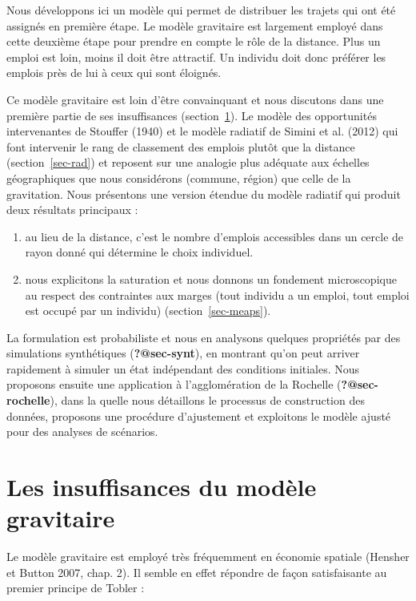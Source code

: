 \documentclass[
  10pt,
  a4paper,
  numbers=noendperiod,
  DIV=9]{scrreprt}
\begin{document}
Nous développons ici un modèle qui permet de distribuer les trajets qui
ont été assignés en première étape. Le modèle gravitaire est largement
employé dans cette deuxième étape pour prendre en compte le rôle de la
distance. Plus un emploi est loin, moins il doit être attractif. Un
individu doit donc préférer les emplois près de lui à ceux qui sont
éloignés.

Ce modèle gravitaire est loin d'être convainquant et nous discutons dans
une première partie de ses insuffisances (section~\ref{sec-grav}). Le
modèle des opportunités intervenantes de Stouffer (1940) et le modèle
radiatif de Simini et al. (2012) qui font intervenir le rang de
classement des emplois plutôt que la distance (section~\ref{sec-rad}) et
reposent sur une analogie plus adéquate aux échelles géographiques que
nous considérons (commune, région) que celle de la gravitation. Nous
présentons une version étendue du modèle radiatif qui produit deux
résultats principaux :

\begin{enumerate}
\def\labelenumi{\arabic{enumi}.}
\item
  au lieu de la distance, c'est le nombre d'emplois accessibles dans un
  cercle de rayon donné qui détermine le choix individuel.
\item
  nous explicitons la saturation et nous donnons un fondement
  microscopique au respect des contraintes aux marges (tout individu a
  un emploi, tout emploi est occupé par un individu)
  (section~\ref{sec-meaps}).
\end{enumerate}

La formulation est probabiliste et nous en analysons quelques propriétés
par des simulations synthétiques (\textbf{?@sec-synt}), en montrant
qu'on peut arriver rapidement à simuler un état indépendant des
conditions initiales. Nous proposons ensuite une application à
l'agglomération de la Rochelle (\textbf{?@sec-rochelle}), dans la quelle
nous détaillons le processus de construction des données, proposons une
procédure d'ajustement et exploitons le modèle ajusté pour des analyses
de scénarios.

\hypertarget{sec-grav}{%
\section{Les insuffisances du modèle gravitaire}\label{sec-grav}}

Le modèle gravitaire est employé très fréquemment en économie spatiale
(Hensher et Button 2007, chap. 2). Il semble en effet répondre de façon
satisfaisante au premier principe de Tobler :
\end{document}
